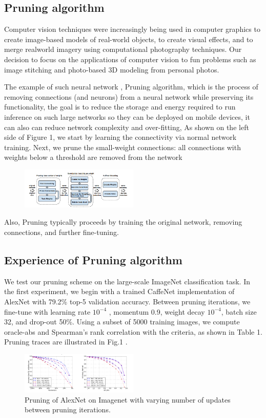 \subsection*{Pruning algorithm}
Computer vision techniques were increasingly being used in computer graphics to create image-based models of real-world objects, to create visual effects, and to merge realworld imagery using computational photography techniques. Our decision to focus on the applications of computer vision to fun problems such as image stitching and photo-based 3D modeling from personal photos. \cite{ref11}

The example of such neural network , Pruning algorithm, which is the process of removing connections (and neurons) from a neural network while preserving its functionality, the goal is to reduce the storage and energy required to run inference on such large networks so they can be deployed on mobile devices, it can also can reduce network complexity and over-fitting, As shown on the left side of Figure 1, we start by learning the connectivity via normal network training. Next, we prune the small-weight connections: all connections with weights below a threshold are removed from the network \cite{ref22}

	\begin{figure}[h]
		\centering
		\includegraphics[width=0.5\textwidth]{section/images/Picture1.png}
		
		\label{fig:labelname}
	\end{figure}
Also, Pruning typically proceeds by training the original network, removing connections, and further fine-tuning. \cite{ref33} 
	
\subsection*{Experience of Pruning algorithm}
We test our pruning scheme on the large-scale ImageNet classification task. In the first experiment, we begin with a trained CaffeNet implementation of AlexNet with 79.2\% top-5 validation accuracy. Between pruning iterations, we fine-tune with learning rate $10^{-4}$ , momentum 0.9, weight decay $10^{-4}$, batch size 32, and drop-out 50\%. Using a subset of 5000 training images, we compute oracle-abs and Spearman’s rank correlation with the criteria, as shown in Table 1. Pruning traces are illustrated in Fig.1 .\cite{ref44} 
	\begin{figure}[h]
	\centering
	\includegraphics[width=0.5\textwidth]{section/images/Picture2.png}
	\caption{Pruning of AlexNet on Imagenet with varying number of updates between pruning iterations.}
	\label{fig:labelname}
\end{figure}
